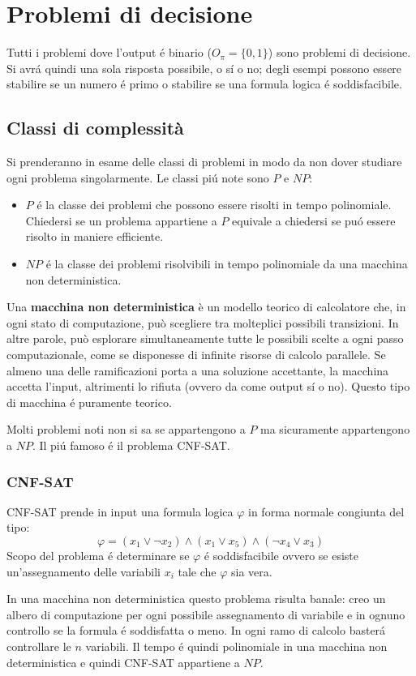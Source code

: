 \section{Problemi di decisione}
Tutti i problemi dove l'output é binario ($O_\pi = \{0,1\}$) sono problemi di decisione. Si avrá quindi una sola risposta possibile, o sí o no; degli esempi possono essere stabilire se un numero é primo o stabilire se una formula logica é soddisfacibile.

\subsection{Classi di complessità}
Si prenderanno in esame delle classi di problemi in modo da non dover studiare ogni problema singolarmente. Le classi piú note sono $P$ e $NP$:
\begin{itemize}
    \item $P$ é la classe dei problemi che possono essere risolti in tempo polinomiale. Chiedersi se un problema appartiene a $P$ equivale a chiedersi se puó essere risolto in maniere efficiente.
    \item $NP$ é la classe dei problemi risolvibili in tempo polinomiale da una macchina non deterministica.
\end{itemize}

Una \textbf{macchina non deterministica} è un modello teorico di calcolatore che, in ogni stato di computazione, può scegliere tra molteplici possibili transizioni. In altre parole, può esplorare simultaneamente tutte le possibili scelte a ogni passo computazionale, come se disponesse di infinite risorse di calcolo parallele. Se almeno una delle ramificazioni porta a una soluzione accettante, la macchina accetta l'input, altrimenti lo rifiuta (ovvero da come output sí o no). Questo tipo di macchina é puramente teorico. 

Molti problemi noti non si sa se appartengono a $P$ ma sicuramente appartengono a $NP$. Il piú famoso é il problema CNF-SAT.

\subsubsection{CNF-SAT}
CNF-SAT prende in input una formula logica $\varphi$ in forma normale congiunta del tipo:
$$ \varphi = (x_1 \lor \lnot x_2) \land (x_1 \lor x_5) \land (\lnot x_4 \lor x_3) $$
Scopo del problema é determinare se $\varphi$ é soddisfacibile ovvero se esiste un'assegnamento delle variabili $x_i$ tale che $\varphi$ sia vera.

In una macchina non deterministica questo problema risulta banale: creo un albero di computazione per ogni possibile assegnamento di variabile e in ognuno controllo se la formula é soddisfatta o meno. In ogni ramo di calcolo basterá controllare le $n$ variabili. Il tempo é quindi polinomiale in una macchina non deterministica e quindi CNF-SAT appartiene a $NP$.